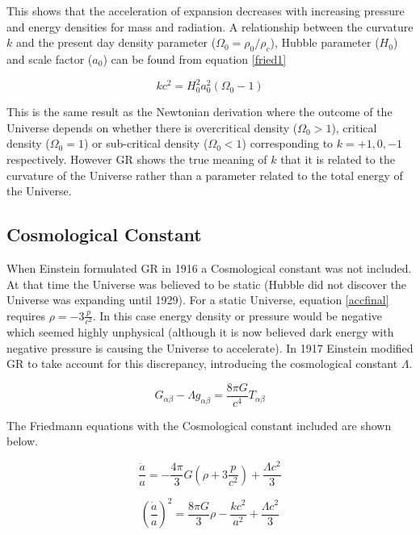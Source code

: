 \documentclass[12pt]{article} %
\begin{document}
This shows that the acceleration of expansion decreases with increasing pressure and energy densities for mass and radiation. A relationship between the curvature $k$ and the present day density parameter ($\Omega_{0} = \rho_{0}/\rho_{c}$), Hubble parameter ($H_{0}$) and scale factor ($a_{0}$) can be found from equation \ref{fried1}

\begin{equation}
k c^2 = H_{0}^2 a_{0}^2(\Omega_{0}-1)
\end{equation}

This is the same result as the Newtonian derivation where the outcome of the Universe depends on whether there is overcritical density ($\Omega_{0}>1$), critical density ($\Omega_{0}=1$) or sub-critical density ($\Omega_{0} <1$) corresponding to $k = +1,0,-1$ respectively. However GR shows the true meaning of $k$ that it is related to the curvature of the Universe rather than a parameter related to the total energy of the Universe.


\subsection{Cosmological Constant}

When Einstein formulated GR in 1916 a Cosmological constant was not included. At that time the Universe was believed to be static (Hubble did not discover the Universe was expanding until 1929)\cite{cambridge}. For a static Universe, equation \ref{accfinal} requires $\rho = -3\frac{p}{c^2}$. In this case energy density or pressure would be negative which seemed highly unphysical (although it is now believed dark energy with negative pressure is causing the Universe to accelerate). In 1917 Einstein modified GR to take account for this discrepancy, introducing the cosmological constant $\Lambda$\cite{coles}.

\begin{equation}
G_{\alpha \beta} - \Lambda g_{\alpha \beta} = \frac{8\pi G}{c^4}T_{\alpha \beta}
\end{equation}

The Friedmann equations with the Cosmological constant included are shown below.

\begin{equation}
\frac{\ddot a}{a} = -\frac{4 \pi}{3}G\left(\rho + 3\frac{p}{c^2}\right) + \frac{\Lambda c^2}{3}
\end{equation}

\begin{equation}
\left(\frac{\dot a}{a}\right)^2 = \frac{8\pi G}{3}\rho -\frac{k c^2}{a^2} + \frac{\Lambda c^2}{3}
\end{equation}
\end{document}
